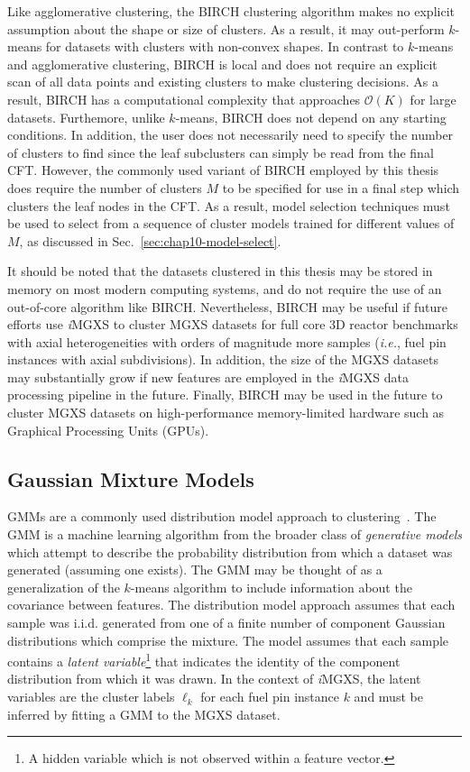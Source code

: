 Like agglomerative clustering, the BIRCH clustering algorithm makes no explicit assumption about the shape or size of clusters. As a result, it may out-perform $k$-means for datasets with clusters with non-convex shapes. In contrast to $k$-means and agglomerative clustering, BIRCH is local and does not require an explicit scan of all data points and existing clusters to make clustering decisions. As a result, BIRCH has a computational complexity that approaches $\mathcal{O}(K)$ for large datasets. Furthemore, unlike $k$-means, BIRCH does not depend on any starting conditions. In addition, the user does not necessarily need to specify the number of clusters to find since the leaf subclusters can simply be read from the final CFT. However, the commonly used variant of BIRCH employed by this thesis does require the number of clusters $M$ to be specified for use in a final step which clusters the leaf nodes in the CFT. As a result, model selection techniques must be used to select from a sequence of cluster models trained for different values of $M$, as discussed in Sec.~\ref{sec:chap10-model-select}.

It should be noted that the datasets clustered in this thesis may be stored in memory on most modern computing systems, and do not require the use of an out-of-core algorithm like BIRCH. Nevertheless, BIRCH may be useful if future efforts use \textit{i}\ac{MGXS} to cluster \ac{MGXS} datasets for full core 3D reactor benchmarks with axial heterogeneities with orders of magnitude more samples (\textit{i.e.}, fuel pin instances with axial subdivisions). In addition, the size of the \ac{MGXS} datasets may substantially grow if new features are employed in the \textit{i}\ac{MGXS} data processing pipeline in the future. Finally, BIRCH may be used in the future to cluster \ac{MGXS} datasets on high-performance memory-limited hardware such as Graphical Processing Units (GPUs).

\subsection{Gaussian Mixture Models}
\label{subsec:chap10-gmms}

\acp{GMM} are a commonly used distribution model approach to clustering~\cite{mclachlan1988mixture}. The \ac{GMM} is a machine learning algorithm from the broader class of \textit{generative models} which attempt to describe the probability distribution from which a dataset was generated (assuming one exists). The \ac{GMM} may be thought of as a generalization of the $k$-means algorithm to include information about the covariance between features. The distribution model approach assumes that each sample was i.i.d. generated from one of a finite number of component Gaussian distributions which comprise the mixture. The model assumes that each sample contains a \textit{latent variable}\footnote{A hidden variable which is not observed within a feature vector.} that indicates the identity of the component distribution from which it was drawn. In the context of \textit{i}\ac{MGXS}, the latent variables are the cluster labels $\ell_{k}$ for each fuel pin instance $k$ and must be inferred by fitting a \ac{GMM} to the \ac{MGXS} dataset.

